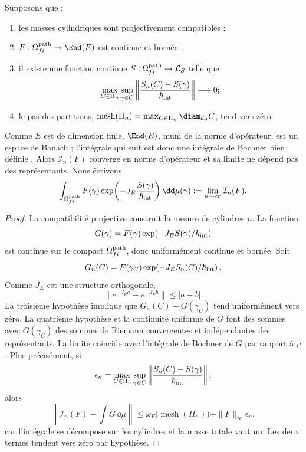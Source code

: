 \begin{theorem}
\label{thm:integral-cilindrica-limite}
Supposons que :
\begin{enumerate}
 \item les masses cylindriques sont projectivement compatibles ;
 \item \(F:\Omega_{fi}^{\rm path}\to\End(E)\) est continue et bornée ;
 \item il existe une fonction continue
       \(S:\Omega_{fi}^{\rm path}\to\mathcal L_S\) telle que
       \[
        \max_{C\in\Pi_n}\sup_{\gamma\in C}
        \left\|
          \frac{S_n(C)-S(\gamma)}{\hbar_{\rm int}}
        \right\|\longrightarrow0;
       \]
 \item le pas des partitions,
       \(\operatorname{mesh}(\Pi_n)
        =\max_{C\in\Pi_n}\diam_{d_\vartheta}C\),
       tend vers zéro.
\end{enumerate}
Comme \(E\) est de dimension finie, \(\End(E)\), muni de la norme
d'opérateur, est un espace de Banach ; l'intégrale qui suit est donc une
intégrale de Bochner bien définie \cite{Bochner1955}.
Alors \(\mathcal I_n(F)\) converge en norme d'opérateur et sa limite ne
dépend pas des représentants. Nous écrivons
\begin{equation}
 \int_{\Omega_{fi}^{\rm path}}
 F(\gamma)
 \exp\!\left(-J_E\frac{S(\gamma)}{\hbar_{\rm int}}\right)
 \dd\mu(\gamma)
 :=\lim_{n\to\infty}\mathcal I_n(F).
 \label{eq:integral-genealogica}
\end{equation}
\end{theorem}

\begin{proof}
La compatibilité projective construit la mesure de cylindres \(\mu\). La
fonction
\[
 G(\gamma)=F(\gamma)
 \exp\!\left(-J_E S(\gamma)/\hbar_{\rm int}\right)
\]
est continue sur le compact \(\Omega_{fi}^{\rm path}\), donc uniformément
continue et bornée. Soit
\[
 G_n(C)=F(\gamma_C)
 \exp\!\left(-J_E S_n(C)/\hbar_{\rm int}\right).
\]
Comme \(J_E\) est une structure orthogonale,
\[
 \|e^{-J_Ea}-e^{-J_Eb}\|\leq |a-b|.
\]
La troisième hypothèse implique que
\(G_n(C)-G(\gamma_C)\) tend uniformément vers zéro. La quatrième hypothèse et la
continuité uniforme de \(G\) font des sommes avec \(G(\gamma_C)\) des
sommes de Riemann convergentes et indépendantes des représentants. La
limite coïncide avec l'intégrale de Bochner de \(G\) par rapport à \(\mu\).
Plus précisément, si
\[
 \epsilon_n
 =\max_{C\in\Pi_n}\sup_{\gamma\in C}
   \left\|
    \frac{S_n(C)-S(\gamma)}{\hbar_{\rm int}}
   \right\|,
\]
alors
\[
 \left\|\mathcal I_n(F)-\int G\,\dd\mu\right\|
 \leq
 \omega_F\!\bigl(\operatorname{mesh}(\Pi_n)\bigr)
 +\|F\|_\infty\epsilon_n,
\]
car l'intégrale se décompose sur les cylindres et la masse totale vaut un.
Les deux termes tendent vers zéro par hypothèse.
\end{proof}

